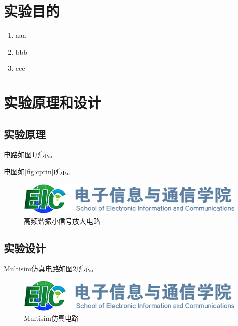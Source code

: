 \documentclass[12pt]{article}
\begin{document}

\newpage

\begin{center}
    \begin{spacing}{1.5}
    \tableofcontents
    \end{spacing}
\end{center}
\newpage

\pagestyle{fancy}

\section{实验目的}

\begin{enumerate}
	\item aaa
	\item bbb
	\item ccc
\end{enumerate}


\section{实验原理和设计}

\subsection{实验原理}

电路如图\ref{fig:cprin}所示。

电图如\autoref{fig:cprin}所示。

\begin{figure}[htbp]
	\centering
    \includegraphics[scale=0.3]{figures/logo-hust-eic.png}
	\caption{高频谐振小信号放大电路}
	\label{fig:cprin}
\end{figure}

\subsection{实验设计}

Multisim仿真电路如图\ref{fig:csim}所示。

\begin{figure}[htbp]
	\centering
	\includegraphics[scale=0.3]{figures/logo-hust-eic.png}
	\caption{Multisim仿真电路}
	\label{fig:csim}
\end{figure}
\end{document}
